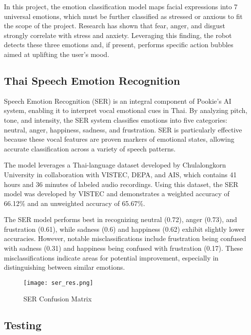 In this project, the emotion classification model maps facial expressions into 7 universal emotions, which must be further classified as stressed or anxious to fit the scope of the project. Research has shown that fear, anger, and disgust \cite{baltrusaitis2018} strongly correlate with stress and anxiety. Leveraging this finding, the robot detects these three emotions and, if present, performs specific action bubbles aimed at uplifting the user’s mood.

\subsection{Thai Speech Emotion Recognition}
Speech Emotion Recognition (SER) is an integral component of Pookie’s AI system, enabling it to interpret vocal emotional cues in Thai. By analyzing pitch, tone, and intensity, the SER system classifies emotions into five categories: neutral, anger, happiness, sadness, and frustration. SER is particularly effective because these vocal features are proven markers of emotional states, allowing accurate classification across a variety of speech patterns.

The model leverages a Thai-language dataset developed by Chulalongkorn University in collaboration with VISTEC, DEPA, and AIS, which contains 41 hours and 36 minutes of labeled audio recordings. Using this dataset, the SER model was developed by VISTEC and demonstrates a weighted accuracy of 66.12\% and an unweighted accuracy of 65.67\%.

The SER model performs best in recognizing neutral (0.72), anger (0.73), and frustration (0.61), while sadness (0.6) and happiness (0.62) exhibit slightly lower accuracies. However, notable misclassifications include frustration being confused with sadness (0.31) and happiness being confused with frustration (0.17). These misclassifications indicate areas for potential improvement, especially in distinguishing between similar emotions.

\begin{figure} [!htb]
    \centering
    \captionsetup{justification=centering}
    \texttt{[image: ser\_res.png]}
    \caption{SER Confusion Matrix}
    \label{fig:ser-con}
\end{figure}

\subsection{Testing}

